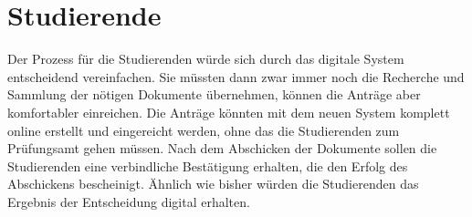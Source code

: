 \section*{Studierende}

Der Prozess für die Studierenden würde sich durch das digitale System entscheidend vereinfachen. Sie müssten dann zwar immer noch die Recherche und Sammlung der nötigen Dokumente übernehmen, können die Anträge aber komfortabler einreichen. Die Anträge könnten mit dem neuen System komplett online erstellt und eingereicht werden, ohne das die Studierenden zum Prüfungsamt gehen müssen. Nach dem Abschicken der Dokumente sollen die Studierenden eine verbindliche Bestätigung erhalten, die den Erfolg des Abschickens bescheinigt. Ähnlich wie bisher würden die Studierenden das Ergebnis der Entscheidung digital erhalten.
